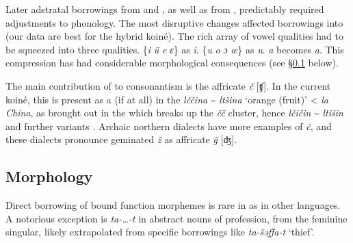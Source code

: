 \documentclass[output=paper]{langsci/langscibook}
\begin{document}
Later adstratal borrowings from  and , as well as from , predictably required adjustments to  phonology. The most disruptive changes affected  borrowings into  (our data are best for the hybrid koiné). The rich array of  vowel qualities had to be squeezed into three  qualities.  \{\textit{i} \textit{ü} \textit{e} \textit{ɛ}\}  as  \textit{i}.  \{\textit{u} \textit{o} \textit{ɔ} \textit{œ}\}  as  \textit{u}.  \textit{a} becomes  \textit{a}. This compression has had considerable morphological consequences (see §\ref{morphol} below).

The main contribution of  to  consonantism is the affricate \textit{č} [ʧ]. In the current koiné, this is present as a  (if at all) in the  \textit{lččina} {\textasciitilde} \textit{ltšina} ‘orange (fruit)’ <  \textit{la} \textit{China}, as brought out in the  which breaks up the \textit{čč} cluster, hence \textit{lčičin} {\textasciitilde} \textit{ltišin} and further variants \citep{Heath1999}. Archaic northern dialects have more examples of \textit{č}, and these dialects pronounce geminated \textit{ž} as affricate \textit{ǧ} [ʤ].

\subsection{Morphology} \label{morphol}

Direct borrowing of bound function morphemes is rare in  as in other languages. A notorious exception is \textit{ta-…-t} in abstract nouns of profession, from the  feminine singular, likely extrapolated from specific  borrowings like \textit{ta-šəffa{\R}-t} ‘thief’. 
\end{document}
